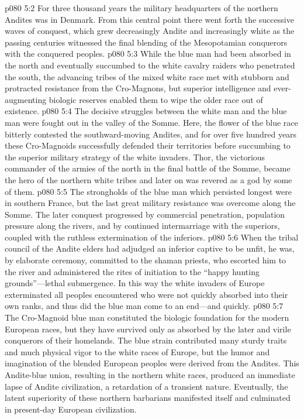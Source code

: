 \vs p080 5:2 For three thousand years the military headquarters of the northern Andites was in Denmark. From this central point there went forth the successive waves of conquest, which grew decreasingly Andite and increasingly white as the passing centuries witnessed the final blending of the Mesopotamian conquerors with the conquered peoples.
\pc \vs p080 5:3 While the blue man had been absorbed in the north and eventually succumbed to the white cavalry raiders who penetrated the south, the advancing tribes of the mixed white race met with stubborn and protracted resistance from the Cro\hyp{}Magnons, but superior intelligence and ever\hyp{}augmenting biologic reserves enabled them to wipe the older race out of existence.
\vs p080 5:4 The decisive struggles between the white man and the blue man were fought out in the valley of the Somme. Here, the flower of the blue race bitterly contested the southward\hyp{}moving Andites, and for over five hundred years these Cro\hyp{}Magnoids successfully defended their territories before succumbing to the superior military strategy of the white invaders. Thor, the victorious commander of the armies of the north in the final battle of the Somme, became the hero of the northern white tribes and later on was revered as a god by some of them.
\pc \vs p080 5:5 The strongholds of the blue man which persisted longest were in southern France, but the last great military resistance was overcome along the Somme. The later conquest progressed by commercial penetration, population pressure along the rivers, and by continued intermarriage with the superiors, coupled with the ruthless extermination of the inferiors.
\vs p080 5:6 When the tribal council of the Andite elders had adjudged an inferior captive to be unfit, he was, by elaborate ceremony, committed to the shaman priests, who escorted him to the river and administered the rites of initiation to the “happy hunting grounds”---lethal submergence. In this way the white invaders of Europe exterminated all peoples encountered who were not quickly absorbed into their own ranks, and thus did the blue man come to an end---and quickly.\plusone
\pc \vs p080 5:7 The Cro\hyp{}Magnoid blue man constituted the biologic foundation for the modern European races, but they have survived only as absorbed by the later and virile conquerors of their homelands. The blue strain contributed many sturdy traits and much physical vigor to the white races of Europe, but the humor and imagination of the blended European peoples were derived from the Andites. This Andite\hyp{}blue union, resulting in the northern white races, produced an immediate lapse of Andite civilization, a retardation of a transient nature. Eventually, the latent superiority of these northern barbarians manifested itself and culminated in present\hyp{}day European civilization.
